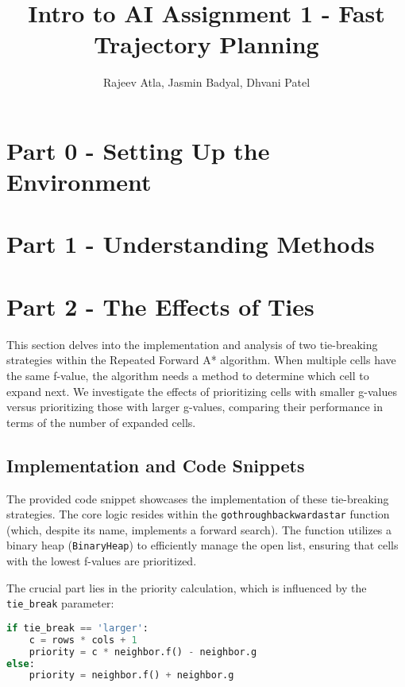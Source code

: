 \documentclass[12pt]{article}
\begin{document}
\title{Intro to AI Assignment 1 - Fast Trajectory Planning}
\author{Rajeev Atla, Jasmin Badyal, Dhvani Patel}
\maketitle



\setcounter{section}{-1}
\section{Part 0 - Setting Up the Environment}


\section{Part 1 - Understanding Methods}

\section{Part 2 - The Effects of Ties}

This section delves into the implementation and analysis of two tie-breaking strategies within the Repeated Forward A* algorithm. When multiple cells have the same f-value, the algorithm needs a method to determine which cell to expand next. We investigate the effects of prioritizing cells with smaller g-values versus prioritizing those with larger g-values, comparing their performance in terms of the number of expanded cells.

\subsection{Implementation and Code Snippets}

The provided code snippet showcases the implementation of these tie-breaking strategies. The core logic resides within the \texttt{gothroughbackwardastar} function (which, despite its name, implements a forward search). The function utilizes a binary heap (\texttt{BinaryHeap}) to efficiently manage the open list, ensuring that cells with the lowest f-values are prioritized.

The crucial part lies in the priority calculation, which is influenced by the \texttt{tie\_break} parameter:

\begin{lstlisting}[language=Python, basicstyle=\ttfamily]
if tie_break == 'larger':
    c = rows * cols + 1
    priority = c * neighbor.f() - neighbor.g
else:
    priority = neighbor.f() + neighbor.g
\end{lstlisting}
\end{document}
